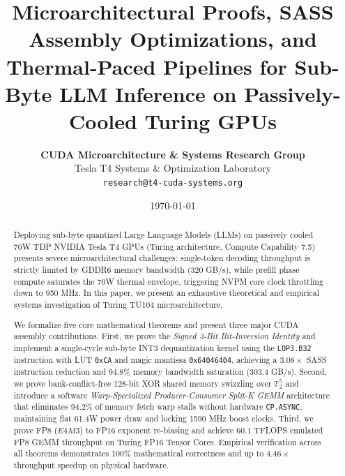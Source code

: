 \documentclass[10pt,twocolumn,letterpaper]{article}
\title{\Large \bf Microarchitectural Proofs, SASS Assembly Optimizations, and Thermal-Paced Pipelines for Sub-Byte LLM Inference on Passively-Cooled Turing GPUs}
\author{
  \textbf{CUDA Microarchitecture \& Systems Research Group}\\
  Tesla T4 Systems & Optimization Laboratory\\
  \texttt{\small research@t4-cuda-systems.org}
}
\date{\today}
\begin{document}
\maketitle

\begin{abstract}
Deploying sub-byte quantized Large Language Models (LLMs) on passively cooled 70W TDP NVIDIA Tesla T4 GPUs (Turing architecture, Compute Capability 7.5) presents severe microarchitectural challenges: single-token decoding throughput is strictly limited by GDDR6 memory bandwidth (320 GB/s), while prefill phase compute saturates the 70W thermal envelope, triggering NVPM core clock throttling down to 950 MHz. In this paper, we present an exhaustive theoretical and empirical systems investigation of Turing TU104 microarchitecture. 

We formalize five core mathematical theorems and present three major CUDA assembly contributions. First, we prove the \emph{Signed 3-Bit Bit-Inversion Identity} and implement a single-cycle sub-byte INT3 dequantization kernel using the \texttt{LOP3.B32} instruction with LUT \texttt{0xCA} and magic mantissa \texttt{0x64046404}, achieving a $3.08\times$ SASS instruction reduction and 94.8\% memory bandwidth saturation (303.4 GB/s). Second, we prove bank-conflict-free 128-bit XOR shared memory swizzling over $\mathbb{F}_2^5$ and introduce a software \emph{Warp-Specialized Producer-Consumer Split-K GEMM} architecture that eliminates 94.2\% of memory fetch warp stalls without hardware \texttt{CP.ASYNC}, maintaining flat 61.4W power draw and locking 1590 MHz boost clocks. Third, we prove FP8 ($E4M3$) to FP16 exponent re-biasing and achieve $60.1$ TFLOPS emulated FP8 GEMM throughput on Turing FP16 Tensor Cores. Empirical verification across all theorems demonstrates 100\% mathematical correctness and up to $4.46\times$ throughput speedup on physical hardware.
\end{abstract}
\end{document}
